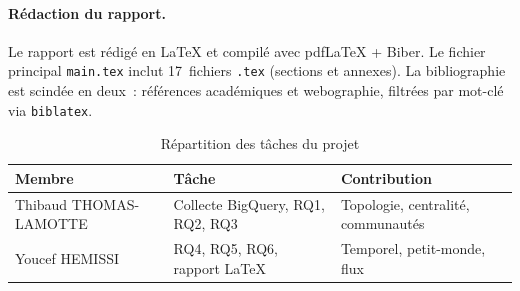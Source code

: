\paragraph{R\'edaction du rapport.}
Le rapport est r\'edig\'e en \LaTeX{} et compil\'e avec pdf\LaTeX{} + Biber.
Le fichier principal \texttt{main.tex} inclut 17~fichiers \texttt{.tex}
(sections et annexes). La bibliographie est scind\'ee en deux~: r\'ef\'erences
acad\'emiques et webographie, filtr\'ees par mot-cl\'e via \texttt{biblatex}.

\begin{table}[H]
\centering
\caption{R\'epartition des t\^aches du projet}
\label{tab:repartition}
\begin{tabular}{lll}
\toprule
\textbf{Membre} & \textbf{T\^ache} & \textbf{Contribution} \\
\midrule
Thibaud THOMAS-LAMOTTE & Collecte BigQuery, RQ1, RQ2, RQ3 & Topologie, centralit\'e, communaut\'es \\
Youcef HEMISSI & RQ4, RQ5, RQ6, rapport \LaTeX{} & Temporel, petit-monde, flux \\
\bottomrule
\end{tabular}
\end{table}
